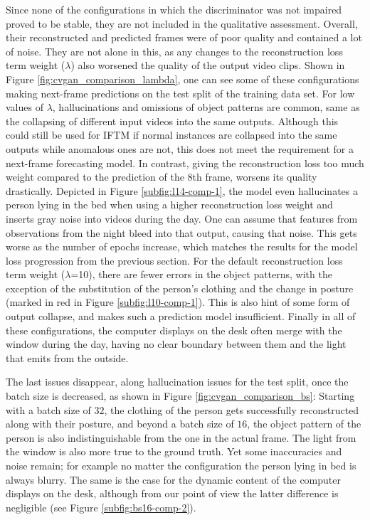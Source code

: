 Since none of the configurations in which the discriminator was not impaired proved to be stable, they are not included in the qualitative assessment. Overall, their reconstructed and predicted frames were of poor quality and contained a lot of noise. They are not alone in this, as any changes to the reconstruction loss term weight ($\lambda$) also worsened the quality of the output video clips. Shown in Figure \ref{fig:cvgan_comparison_lambda}, one can see some of these configurations making next-frame predictions on the test split of the training data set. For low values of $\lambda$, hallucinations and omissions of object patterns are common, same as the collapsing of different input videos into the same outputs. Although this could still be used for IFTM if normal instances are collapsed into the same outputs while anomalous ones are not, this does not meet the requirement for a next-frame forecasting model. In contrast, giving the reconstruction loss too much weight compared to the prediction of the 8th frame, worsens its quality drastically. Depicted in Figure \ref{subfig:l14-comp-1}, the model even hallucinates a person lying in the bed when using a higher reconstruction loss weight and inserts gray noise into videos during the day. One can assume that features from observations from the night bleed into that output, causing that noise. This gets worse as the number of epochs increase, which matches the results for the model loss progression from the previous section. For the default reconstruction loss term weight ($\lambda$=10), there are fewer errors in the object patterns, with the exception of the substitution of the person's clothing and the change in posture (marked in red in Figure \ref{subfig:l10-comp-1}). This is also hint of some form of output collapse, and makes such a prediction model insufficient. Finally in all of these configurations, the computer displays on the desk often merge with the window during the day, having no clear boundary between them and the light that emits from the outside. 

The last issues disappear, along hallucination issues for the test split, once the batch size is decreased, as shown in Figure \ref{fig:cvgan_comparison_bs}: Starting with a batch size of $32$, the clothing of the person gets successfully reconstructed along with their posture, and beyond a batch size of $16$, the object pattern of the person is also indistinguishable from the one in the actual frame. The light from the window is also more true to the ground truth. Yet some inaccuracies and noise remain; for example no matter the configuration the person lying in bed is always blurry. The same is the case for the dynamic content of the computer displays on the desk, although from our point of view the latter difference is negligible (see Figure \ref{subfig:bs16-comp-2}).


